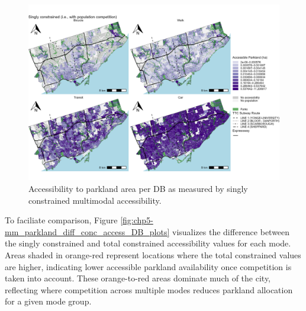 \documentclass[
11pt, %
oneside, %
english, %
singlespacing, %
]{macthesis} %
\begin{document}
\begin{figure}

{\centering \includegraphics[width=6in]{./data/figures/chp5-mm_parkland_singly_conc_access_DB_plots} 

}

\caption{\label{fig:chp5-mm_parkland_singly_conc_access_DB_plots}Accessibility to parkland area per DB as measured by singly constrained multimodal accessibility.}\label{fig:unnamed-chunk-77}
\end{figure}

To faciliate comparison, Figure \ref{fig:chp5-mm_parkland_diff_conc_access_DB_plots} visualizes the difference between the singly constrained and total constrained accessibility values for each mode. Areas shaded in orange-red represent locations where the total constrained values are higher, indicating lower accessible parkland availability once competition is taken into account. These orange-to-red areas dominate much of the city, reflecting where competition across multiple modes reduces parkland allocation for a given mode group.
\end{document}
